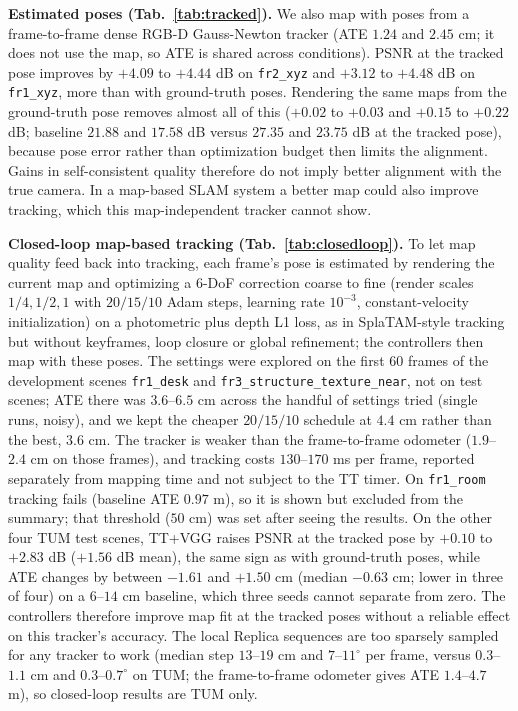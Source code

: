 \documentclass[10pt,twocolumn,letterpaper]{article}
\begin{document}
\textbf{Estimated poses (Tab.~\ref{tab:tracked}).}
We also map with poses from a frame-to-frame dense RGB-D Gauss-Newton tracker (ATE $1.24$ and $2.45$ cm; it does not use the map, so ATE is shared across conditions). PSNR at the tracked pose improves by $+4.09$ to $+4.44$ dB on \texttt{fr2\_xyz} and $+3.12$ to $+4.48$ dB on \texttt{fr1\_xyz}, more than with ground-truth poses. Rendering the same maps from the ground-truth pose removes almost all of this ($+0.02$ to $+0.03$ and $+0.15$ to $+0.22$ dB; baseline $21.88$ and $17.58$ dB versus $27.35$ and $23.75$ dB at the tracked pose), because pose error rather than optimization budget then limits the alignment. Gains in self-consistent quality therefore do not imply better alignment with the true camera. In a map-based SLAM system a better map could also improve tracking, which this map-independent tracker cannot show.


\textbf{Closed-loop map-based tracking (Tab.~\ref{tab:closedloop}).}
To let map quality feed back into tracking, each frame's pose is estimated by rendering the current map and optimizing a 6-DoF correction coarse to fine (render scales $1/4,1/2,1$ with $20/15/10$ Adam steps, learning rate $10^{-3}$, constant-velocity initialization) on a photometric plus depth L1 loss, as in SplaTAM-style tracking but without keyframes, loop closure or global refinement; the controllers then map with these poses. The settings were explored on the first 60 frames of the development scenes \texttt{fr1\_desk} and \texttt{fr3\_structure\_texture\_near}, not on test scenes; ATE there was $3.6$--$6.5$ cm across the handful of settings tried (single runs, noisy), and we kept the cheaper $20/15/10$ schedule at $4.4$ cm rather than the best, $3.6$ cm. The tracker is weaker than the frame-to-frame odometer ($1.9$--$2.4$ cm on those frames), and tracking costs $130$--$170$ ms per frame, reported separately from mapping time and not subject to the TT timer. On \texttt{fr1\_room} tracking fails (baseline ATE $0.97$ m), so it is shown but excluded from the summary; that threshold ($50$ cm) was set after seeing the results. On the other four TUM test scenes, TT+VGG raises PSNR at the tracked pose by $+0.10$ to $+2.83$ dB ($+1.56$ dB mean), the same sign as with ground-truth poses, while ATE changes by between $-1.61$ and $+1.50$ cm (median $-0.63$ cm; lower in three of four) on a $6$--$14$ cm baseline, which three seeds cannot separate from zero. The controllers therefore improve map fit at the tracked poses without a reliable effect on this tracker's accuracy. The local Replica sequences are too sparsely sampled for any tracker to work (median step $13$--$19$ cm and $7$--$11^\circ$ per frame, versus $0.3$--$1.1$ cm and $0.3$--$0.7^\circ$ on TUM; the frame-to-frame odometer gives ATE $1.4$--$4.7$ m), so closed-loop results are TUM only.

\end{document}
